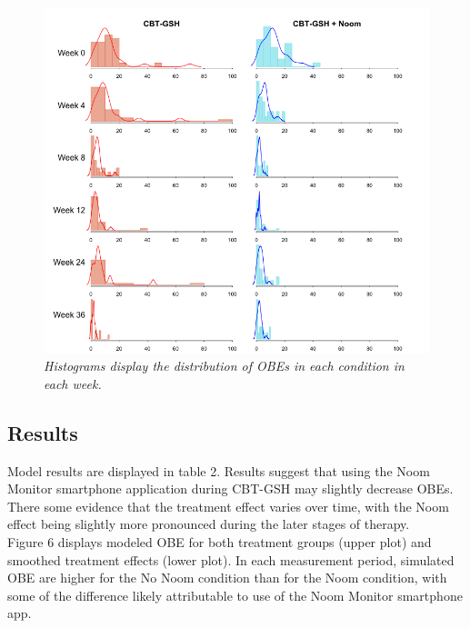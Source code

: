 \documentclass[12pt, oneside]{article}
\begin{document}
\begin{figure}[h]
\centering
\includegraphics[width=\textwidth, height=\textheight, keepaspectratio]{ppc_hist_dens.png}
\caption{\emph{Histograms display the distribution of OBEs in each condition in each week.}}
\end{figure}

\subsection{Results}
Model results are displayed in table 2.  Results suggest that using the Noom Monitor smartphone application during CBT-GSH may slightly decrease OBEs.  There some evidence that the treatment effect varies over time, with the Noom effect being slightly more pronounced during the later stages of therapy.
\\

Figure 6 displays modeled OBE for both treatment groups (upper plot) and smoothed treatment effects (lower plot).  In each measurement period, simulated OBE are higher for the No Noom condition than for the Noom condition, with some of the difference likely attributable to use of the Noom Monitor smartphone app.  
\end{document}
